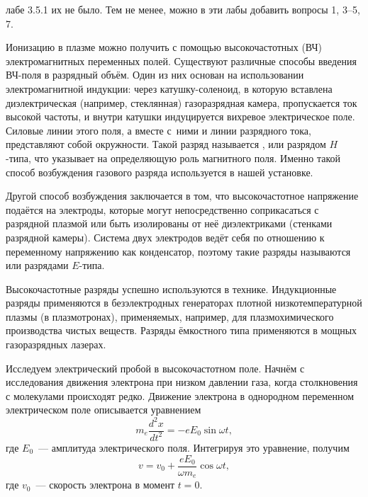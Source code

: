 
лабе 3.5.1 их не было. Тем не менее, можно в эти лабы добавить вопросы 1, 3--5,
7.



Ионизацию в плазме можно получить с помощью высокочастотных (ВЧ)
электромагнитных переменных полей. Существуют различные способы введения ВЧ-поля
в разрядный объём. Один из них основан на использовании электромагнитной
индукции: через катушку-соленоид, в которую вставлена диэлектрическая
(например, стеклянная) газоразрядная камера, пропускается ток высокой частоты,
и внутри катушки индуцируется вихревое электрическое поле.
Силовые линии этого поля, а вместе с~ними и линии разрядного тока,
представляют собой окружности. Такой разряд называется ,
 или разрядом $H$-типа, что указывает
на определяющую роль магнитного поля. Именно такой способ возбуждения газового
разряда используется в нашей установке.

Другой способ возбуждения заключается в том, что высокочастотное напряжение
подаётся на электроды, которые могут непосредственно соприкасаться с разрядной
плазмой или быть изолированы от неё диэлектриками (стенками разрядной камеры).
Система двух электродов ведёт себя по отношению к переменному напряжению как
конденсатор, поэтому такие разряды называются  или
разрядами $E$-типа.

Высокочастотные разряды успешно используются в технике. Индукционные разряды
применяются в безэлектродных генераторах плотной низкотемпературной плазмы
(в плазмотронах), применяемых, например, для плазмохимического производства
чистых
веществ. Разряды ёмкостного типа применяются в мощных газоразрядных лазерах.

Исследуем электрический пробой в высокочастотном поле. Начнём с исследования
движения электрона при низком давлении газа, когда столкновения с молекулами
происходят редко. Движение электрона в однородном переменном электрическом поле
описывается уравнением
\begin{equation*}
    m_e\frac{d^2x}{dt^2}=-eE_0\sin\omega t,
\end{equation*}
где $E_0$~--- амплитуда электрического поля. Интегрируя это уравнение, получим
\begin{equation*}
    v=v_0+\frac{eE_0}{\omega m_e}\cos\omega t,
\end{equation*}
где $v_0$~--- скорость электрона в момент $t=0$.

